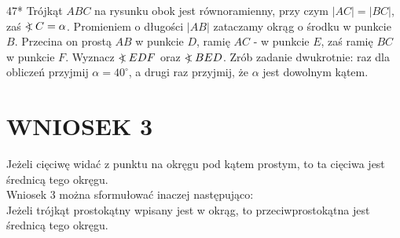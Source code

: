 \documentclass[10pt]{article}
\newcommand\Varangle{\mathop{{<\!\!\!\!\!\text{\small)}}\:}\nolimits}
\begin{document}
47* Trójkąt \(A B C\) na rysunku obok jest równoramienny, przy czym \(|A C|=|B C|\), zaś \(\Varangle C=\alpha\). Promieniem o długości \(|A B|\) zataczamy okrąg o środku w punkcie \(B\). Przecina on prostą \(A B\) w punkcie \(D\), ramię \(A C\) - w punkcie \(E\), zaś ramię \(B C\) w punkcie \(F\). Wyznacz \(\Varangle E D F\) oraz \(\Varangle B E D\). Zrób zadanie dwukrotnie: raz dla obliczeń przyjmij \(\alpha=40^{\circ}\), a drugi raz przyjmij, że \(\alpha\) jest dowolnym kątem.

\section*{WNIOSEK 3}
Jeżeli cięciwę widać z punktu na okręgu pod kątem prostym, to ta cięciwa jest średnicą tego okręgu.\\
Wniosek 3 można sformułować inaczej następująco:\\
Jeżeli trójkąt prostokątny wpisany jest w okrąg, to przeciwprostokątna jest średnicą tego okręgu.
\end{document}
